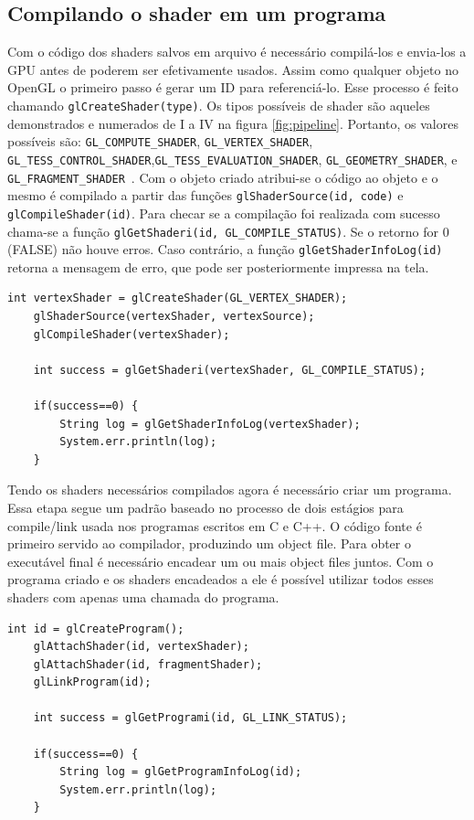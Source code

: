 \documentclass[12pt, 
openright, 
oneside, 
a4paper,    
brazil]{facom-ufu-abntex2}
\begin{document}
\subsection{Compilando o shader em um programa}
Com o código dos shaders salvos em arquivo é necessário compilá-los e envia-los a GPU antes de poderem ser efetivamente usados. Assim como qualquer objeto no OpenGL o primeiro passo é gerar um ID para referenciá-lo. Esse processo é feito chamando \texttt{glCreateShader(type)}. Os tipos possíveis de shader são aqueles demonstrados e numerados de I a IV na figura \ref{fig:pipeline}. Portanto, os valores possíveis são: \texttt{GL_COMPUTE_SHADER},  \texttt{GL_VERTEX_SHADER},  \texttt{GL_TESS_CONTROL_SHADER},\linebreak  \texttt{GL_TESS_EVALUATION_SHADER},  \texttt{GL_GEOMETRY_SHADER}, e  \texttt{GL_FRAGMENT_SHADER}~\cite{openGLShaderCompilation}. Com o objeto criado atribui-se o código ao objeto e o mesmo é compilado a partir das funções \texttt{glShaderSource(id, code)} e \texttt{glCompileShader(id)}. Para checar se a compilação foi realizada com sucesso chama-se a função \texttt{glGetShaderi(id, GL_COMPILE_STATUS)}. Se o retorno for 0 (FALSE) não houve erros. Caso contrário, a função \texttt{glGetShaderInfoLog(id)} retorna a mensagem de erro, que pode ser posteriormente impressa na tela.

 \begin{lstlisting}[caption=Processo de compilação do shader]
	int vertexShader = glCreateShader(GL_VERTEX_SHADER);
	glShaderSource(vertexShader, vertexSource);
	glCompileShader(vertexShader);
	
	int success = glGetShaderi(vertexShader, GL_COMPILE_STATUS);
			
	if(success==0) {
		String log = glGetShaderInfoLog(vertexShader);
		System.err.println(log);
	}
\end{lstlisting}

Tendo os shaders necessários compilados agora é necessário criar um programa. Essa etapa segue um padrão baseado no processo de dois estágios para compile/link usada nos programas escritos em C e C++. O código fonte é primeiro servido ao compilador, produzindo um object file. Para obter o executável final é necessário encadear um ou mais object files juntos. Com o programa criado e os shaders encadeados a ele é possível utilizar todos esses shaders com apenas uma chamada do programa.

 \begin{lstlisting}[caption=Processo de criação e link de um programa]
	int id = glCreateProgram();
	glAttachShader(id, vertexShader);
	glAttachShader(id, fragmentShader);
	glLinkProgram(id);
	
	int success = glGetProgrami(id, GL_LINK_STATUS);
			
	if(success==0) {
		String log = glGetProgramInfoLog(id);
		System.err.println(log);
	}
\end{lstlisting}
\end{document}
